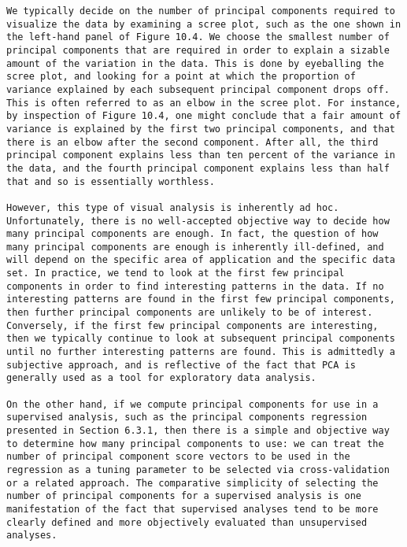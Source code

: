 \documentclass[10pt]{article}
\begin{document}
\begin{verbatim}
We typically decide on the number of principal components required to visualize the data by examining a scree plot, such as the one shown in the left-hand panel of Figure 10.4. We choose the smallest number of principal components that are required in order to explain a sizable amount of the variation in the data. This is done by eyeballing the scree plot, and looking for a point at which the proportion of variance explained by each subsequent principal component drops off. This is often referred to as an elbow in the scree plot. For instance, by inspection of Figure 10.4, one might conclude that a fair amount of variance is explained by the first two principal components, and that there is an elbow after the second component. After all, the third principal component explains less than ten percent of the variance in the data, and the fourth principal component explains less than half that and so is essentially worthless.

However, this type of visual analysis is inherently ad hoc. Unfortunately, there is no well-accepted objective way to decide how many principal components are enough. In fact, the question of how many principal components are enough is inherently ill-defined, and will depend on the specific area of application and the specific data set. In practice, we tend to look at the first few principal components in order to find interesting patterns in the data. If no interesting patterns are found in the first few principal components, then further principal components are unlikely to be of interest. Conversely, if the first few principal components are interesting, then we typically continue to look at subsequent principal components until no further interesting patterns are found. This is admittedly a subjective approach, and is reflective of the fact that PCA is generally used as a tool for exploratory data analysis.

On the other hand, if we compute principal components for use in a supervised analysis, such as the principal components regression presented in Section 6.3.1, then there is a simple and objective way to determine how many principal components to use: we can treat the number of principal component score vectors to be used in the regression as a tuning parameter to be selected via cross-validation or a related approach. The comparative simplicity of selecting the number of principal components for a supervised analysis is one manifestation of the fact that supervised analyses tend to be more clearly defined and more objectively evaluated than unsupervised analyses.


\end{verbatim}
\end{document}

